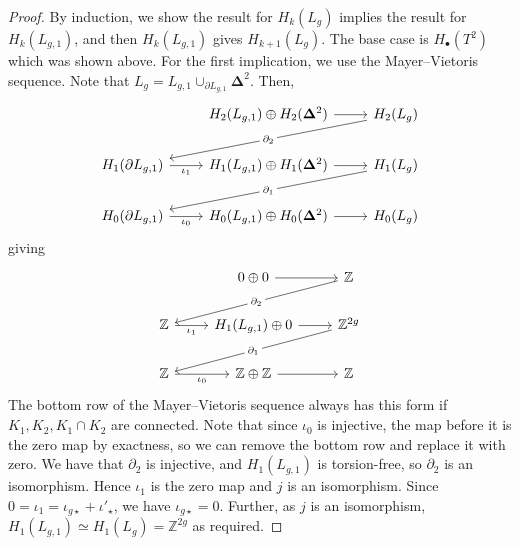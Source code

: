 \begin{proof}
	By induction, we show the result for \( H_k(L_g) \) implies the result for \( H_k(L_{g,1}) \), and then \( H_k(L_{g,1}) \) gives \( H_{k+1}(L_g) \).
	The base case is \( H_\bullet(T^2) \) which was shown above.
	For the first implication, we use the Mayer--Vietoris sequence.
	Note that \( L_g = L_{g,1} \cup_{\partial L_{g,1}} \bm\Delta^2 \).
	Then,
	\[\begin{tikzcd}
		& {H_2(L_{g,1}) \oplus H_2(\bm\Delta^2)} & {H_2(L_g)} \\
		{H_1(\partial L_{g,1})} & {H_1(L_{g,1}) \oplus H_1(\bm\Delta^2)} & {H_1(L_g)} \\
		{H_0(\partial L_{g,1})} & {H_0(L_{g,1}) \oplus H_0(\bm\Delta^2)} & {H_0(L_g)}
		\arrow[from=1-2, to=1-3]
		\arrow["{\partial_2}"{description}, from=1-3, to=2-1]
		\arrow["{\iota_1}"', from=2-1, to=2-2]
		\arrow[from=2-2, to=2-3]
		\arrow["{\partial_1}"{description}, from=2-3, to=3-1]
		\arrow["{\iota_0}"', from=3-1, to=3-2]
		\arrow[from=3-2, to=3-3]
	\end{tikzcd}\]
	giving
	\[\begin{tikzcd}
		& {0 \oplus 0} & {\mathbb Z} \\
		{\mathbb Z} & {H_1(L_{g,1}) \oplus 0} & {\mathbb Z^{2g}} \\
		{\mathbb Z} & {\mathbb Z \oplus \mathbb Z} & {\mathbb Z}
		\arrow[from=1-2, to=1-3]
		\arrow["{\partial_2}"{description}, from=1-3, to=2-1]
		\arrow["{\iota_1}"', from=2-1, to=2-2]
		\arrow[from=2-2, to=2-3]
		\arrow["{\partial_1}"{description}, from=2-3, to=3-1]
		\arrow["{\iota_0}"', from=3-1, to=3-2]
		\arrow[from=3-2, to=3-3]
	\end{tikzcd}\]
	The bottom row of the Mayer--Vietoris sequence always has this form if \( K_1, K_2, K_1 \cap K_2 \) are connected.
	Note that since \( \iota_0 \) is injective, the map before it is the zero map by exactness, so we can remove the bottom row and replace it with zero.
	We have that \( \partial_2 \) is injective, and \( H_1(L_{g,1}) \) is torsion-free, so \( \partial_2 \) is an isomorphism.
	Hence \( \iota_1 \) is the zero map and \( j \) is an isomorphism.
	Since \( 0 = \iota_1 = \iota_{g\star} + \iota'_\star \), we have \( \iota_{g\star} = 0 \).
	Further, as \( j \) is an isomorphism, \( H_1(L_{g,1}) \simeq H_1(L_g) = \mathbb Z^{2g} \) as required.


\end{proof}

